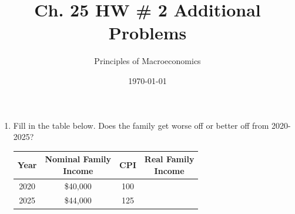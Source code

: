\documentclass{article}
\title{Ch. 25 HW \# 2 Additional Problems}
\author{Principles of Macroeconomics}
\date{\today}
\begin{document}
\maketitle

\begin{enumerate}

%
%	
%	
%	
%	
%	
%	
%	

\item Fill in the table below. Does the family get worse off or better off from 2020-2025?

	\begin{center}
	\begin{tabular}{| c | c | c | c |}
	\hline
	Year & \makecell{Nominal Family\\Income} & CPI & \makecell{Real Family\\Income} \\
	\hline
	2020 & \$40,000 & 100 & \\
	\hline
	2025 & \$44,000 & 125 & \\
	\hline
	\end{tabular}
	\end{center}
	

\end{enumerate}
\end{document}
